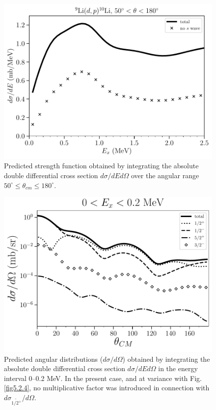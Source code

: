   \begin{figure}
	\centerline{\includegraphics[width=12cm]{C6/figs_C6/FigBook3}}
	\caption{ Predicted strength function obtained by integrating the absolute double differential cross section $d\sigma/dEd\Omega$ over the angular range $50^\circ\leq\theta_{cm}\leq180^\circ$.}\label{fig5.2.5}
\end{figure}
  \begin{figure}
	\centerline{\includegraphics[width=12cm]{C6/figs_C6/FigBook2}}
	\caption{  Predicted angular distributions ($d\sigma/d\Omega$) obtained by integrating the absolute double differential cross section $d\sigma/dEd\Omega$ in the energy interval 0--0.2 MeV. In the present case, and at variance with Fig. \ref{fig5.2.4}, no multiplicative factor was introduced in connection with $d\sigma_{\widetilde {1/2^+}}/d\Omega$.}\label{fig5.2.6}
\end{figure}

